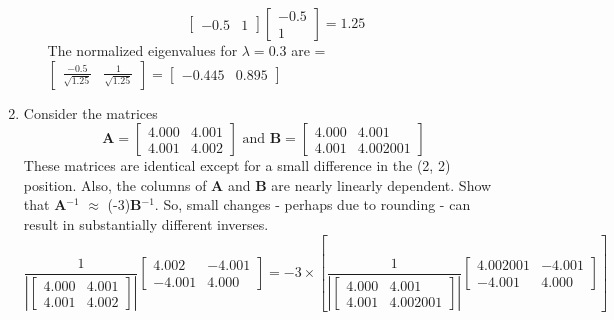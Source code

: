 \documentclass[12pt,a4paper]{paper}
\begin{document}
\begin{enumerate}
\begin{enumerate}
\begin{equation}
\left[\begin{array}{cc}-0.5 &  1\end{array}\right]\left[\begin{array}{c}-0.5 \\  1\end{array}\right] = 1.25
\end{equation}
The normalized eigenvalues for $\lambda = 0.3$ are = $\left[\begin{array}{cc}\frac{-0.5}{\sqrt{1.25}} &  \frac{1}{\sqrt{1.25}}\end{array}\right] = \left[\begin{array}{cc}-0.445 & 0.895\end{array}\right]$
\end{enumerate}
\item Consider the matrices \[ \textbf{A}= \left[ \begin{array}{cc}
4.000 & 4.001 \\
4.001 & 4.002
\end{array} \right]
\text{ and } 
\textbf{B}=\left[ \begin{array}{cc}
4.000 & 4.001 \\
4.001 & 4.002001
\end{array} \right]
\]
These matrices are identical except for a small difference in the (2, 2) position. Also, the columns of \textbf{A} and \textbf{B} are nearly linearly dependent. Show that \textbf{A}$^{-1}$ $\approx$ (-3)\textbf{B}$^{-1}$. So, small changes - perhaps due to rounding - can result in substantially different inverses.
\begin{equation}
\frac{1}{\left|\left[ \begin{array}{cc}4.000 & 4.001 \\4.001 & 4.002\end{array} \right]\right|}\left[ \begin{array}{cc}4.002 & -4.001 \\-4.001 & 4.000\end{array} \right] = -3\times\left[\frac{1}{\left|\left[ \begin{array}{cc}4.000 & 4.001 \\4.001 & 4.002001\end{array} \right]\right|}\left[ \begin{array}{cc}4.002001 & -4.001 \\-4.001 & 4.000 \end{array} \right]\right]
\end{equation}

\end{enumerate}
\end{document}
